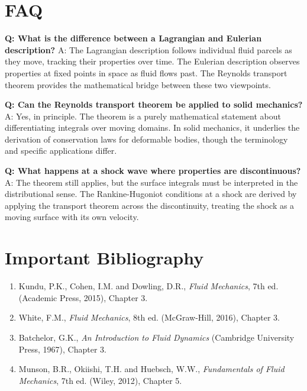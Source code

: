 \section*{FAQ}

\textbf{Q: What is the difference between a Lagrangian and Eulerian description?}
A: The Lagrangian description follows individual fluid parcels as they move, tracking their properties over time. The Eulerian description observes properties at fixed points in space as fluid flows past. The Reynolds transport theorem provides the mathematical bridge between these two viewpoints.

\textbf{Q: Can the Reynolds transport theorem be applied to solid mechanics?}
A: Yes, in principle. The theorem is a purely mathematical statement about differentiating integrals over moving domains. In solid mechanics, it underlies the derivation of conservation laws for deformable bodies, though the terminology and specific applications differ.

\textbf{Q: What happens at a shock wave where properties are discontinuous?}
A: The theorem still applies, but the surface integrals must be interpreted in the distributional sense. The Rankine-Hugoniot conditions at a shock are derived by applying the transport theorem across the discontinuity, treating the shock as a moving surface with its own velocity.
\section*{Important Bibliography}

\begin{enumerate}
\item Kundu, P.K., Cohen, I.M. and Dowling, D.R., \textit{Fluid Mechanics}, 7th ed. (Academic Press, 2015), Chapter 3.
\item White, F.M., \textit{Fluid Mechanics}, 8th ed. (McGraw-Hill, 2016), Chapter 3.
\item Batchelor, G.K., \textit{An Introduction to Fluid Dynamics} (Cambridge University Press, 1967), Chapter 3.
\item Munson, B.R., Okiishi, T.H. and Huebsch, W.W., \textit{Fundamentals of Fluid Mechanics}, 7th ed. (Wiley, 2012), Chapter 5.
\end{enumerate}

